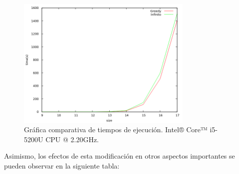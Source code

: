 \documentclass[11pt,a4paper]{article}
\begin{document}
			\vspace{2mm}

			\begin{figure}[h]

				\centering
				\includegraphics[width=0.75\textwidth]{ComparativaGreedy-Inf.png}
				\caption{Gráfica comparativa de tiempos de ejecución. Intel® Core™ i5-5200U CPU @ 2.20GHz.}
				
			\end{figure}

\newpage

			\par
			Asimismo, los efectos de esta modificación en otros aspectos importantes se pueden observar en la siguiente tabla:

			\vspace{2mm}
\end{document}
